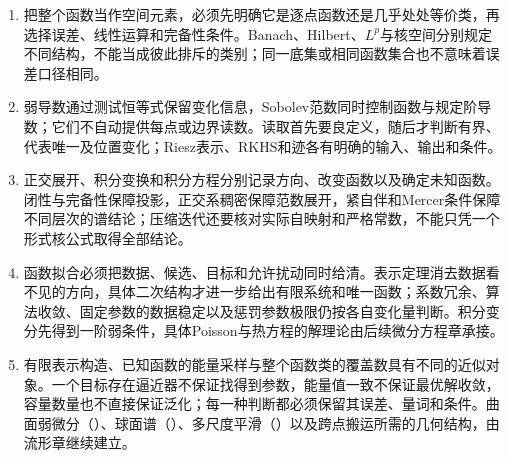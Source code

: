 \begin{enumerate}
  \item 把整个函数当作空间元素，必须先明确它是逐点函数还是几乎处处等价类，再选择误差、线性运算和完备性条件。Banach、Hilbert、$L^p$与核空间分别规定不同结构，不能当成彼此排斥的类别；同一底集或相同函数集合也不意味着误差口径相同。

  \item 弱导数通过测试恒等式保留变化信息，Sobolev范数同时控制函数与规定阶导数；它们不自动提供每点或边界读数。读取首先要良定义，随后才判断有界、代表唯一及位置变化；Riesz表示、RKHS和迹各有明确的输入、输出和条件。

  \item 正交展开、积分变换和积分方程分别记录方向、改变函数以及确定未知函数。闭性与完备性保障投影，正交系稠密保障范数展开，紧自伴和Mercer条件保障不同层次的谱结论；压缩迭代还要核对实际自映射和严格常数，不能只凭一个形式核公式取得全部结论。

  \item 函数拟合必须把数据、候选、目标和允许扰动同时给清。表示定理消去数据看不见的方向，具体二次结构才进一步给出有限系统和唯一函数；系数冗余、算法收敛、固定参数的数据稳定以及惩罚参数极限仍按各自变化量判断。积分变分先得到一阶弱条件，具体Poisson与热方程的解理论由后续微分方程章承接。

  \item 有限表示构造、已知函数的能量采样与整个函数类的覆盖数具有不同的近似对象。一个目标存在逼近器不保证找得到参数，能量值一致不保证最优解收敛，容量数量也不直接保证泛化；每一种判断都必须保留其误差、量词和条件。曲面弱微分（）、球面谱（）、多尺度平滑（）以及跨点搬运所需的几何结构，由流形章继续建立。
\end{enumerate}
